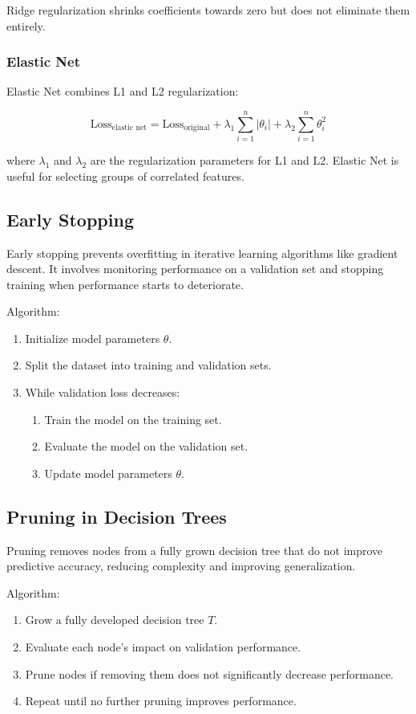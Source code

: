 \documentclass[12pt]{book} %
\begin{document}
Ridge regularization shrinks coefficients towards zero but does not eliminate them entirely.

\subsubsection{Elastic Net}

Elastic Net combines L1 and L2 regularization:

\[
\text{Loss}_{\text{elastic net}} = \text{Loss}_{\text{original}} + \lambda_1 \sum_{i=1}^{n} |\theta_i| + \lambda_2 \sum_{i=1}^{n} \theta_i^2
\]

where \( \lambda_1 \) and \( \lambda_2 \) are the regularization parameters for L1 and L2. Elastic Net is useful for selecting groups of correlated features.

\subsection{Early Stopping}

Early stopping prevents overfitting in iterative learning algorithms like gradient descent. It involves monitoring performance on a validation set and stopping training when performance starts to deteriorate.

Algorithm:
\begin{enumerate}
    \item Initialize model parameters \( \theta \).
    \item Split the dataset into training and validation sets.
    \item While validation loss decreases:
    \begin{enumerate}
        \item Train the model on the training set.
        \item Evaluate the model on the validation set.
        \item Update model parameters \( \theta \).
    \end{enumerate}
\end{enumerate}

\subsection{Pruning in Decision Trees}

Pruning removes nodes from a fully grown decision tree that do not improve predictive accuracy, reducing complexity and improving generalization.

Algorithm:
\begin{enumerate}
    \item Grow a fully developed decision tree \( T \).
    \item Evaluate each node's impact on validation performance.
    \item Prune nodes if removing them does not significantly decrease performance.
    \item Repeat until no further pruning improves performance.
\end{enumerate}
\end{document}
